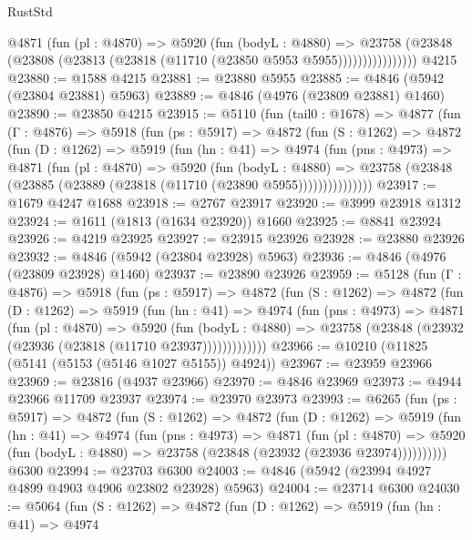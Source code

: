 \begin{lexlean}{RustStd}
\begin{coremodule}
                  @4871
                    (fun (pl : @4870) =>
                    @5920
                      (fun (bodyL : @4880) =>
                      @23758
                        (@23848 (@23808 (@23813 (@23818 (@11710 (@23850 @5953 @5955))))))))))))))))
    @4215
@23880 := @1588 @4215
@23881 := @23880 @5955
@23885 := @4846 (@5942 (@23804 @23881) @5963)
@23889 := @4846 (@4976 (@23809 @23881) @1460)
@23890 := @23850 @4215
@23915 := @5110
    (fun (tail0 : @1678) =>
    @4877
      (fun (Γ : @4876) =>
      @5918
        (fun (ps : @5917) =>
        @4872
          (fun (S : @1262) =>
          @4872
            (fun (D : @1262) =>
            @5919
              (fun (hn : @41) =>
              @4974
                (fun (pns : @4973) =>
                @4871
                  (fun (pl : @4870) =>
                  @5920
                    (fun (bodyL : @4880) =>
                    @23758 (@23848 (@23885 (@23889 (@23818 (@11710 (@23890 @5955)))))))))))))))
@23917 := @1679 @4247 @1688
@23918 := @2767 @23917
@23920 := @3999 @23918 @1312
@23924 := @1611 (@1813 (@1634 @23920)) @1660
@23925 := @8841 @23924
@23926 := @4219 @23925
@23927 := @23915 @23926
@23928 := @23880 @23926
@23932 := @4846 (@5942 (@23804 @23928) @5963)
@23936 := @4846 (@4976 (@23809 @23928) @1460)
@23937 := @23890 @23926
@23959 := @5128
    (fun (Γ : @4876) =>
    @5918
      (fun (ps : @5917) =>
      @4872
        (fun (S : @1262) =>
        @4872
          (fun (D : @1262) =>
          @5919
            (fun (hn : @41) =>
            @4974
              (fun (pns : @4973) =>
              @4871
                (fun (pl : @4870) =>
                @5920
                  (fun (bodyL : @4880) =>
                  @23758 (@23848 (@23932 (@23936 (@23818 (@11710 @23937)))))))))))))
@23966 := @10210 (@11825 (@5141 (@5153 (@5146 @1027 @5155)) @4924))
@23967 := @23959 @23966
@23969 := @23816 (@4937 @23966)
@23970 := @4846 @23969
@23973 := @4944 @23966 @11709 @23937
@23974 := @23970 @23973
@23993 := @6265
    (fun (ps : @5917) =>
    @4872
      (fun (S : @1262) =>
      @4872
        (fun (D : @1262) =>
        @5919
          (fun (hn : @41) =>
          @4974
            (fun (pns : @4973) =>
            @4871
              (fun (pl : @4870) =>
              @5920 (fun (bodyL : @4880) => @23758 (@23848 (@23932 (@23936 @23974))))))))))
    @6300
@23994 := @23703 @6300
@24003 := @4846 (@5942 (@23994 @4927 @4899 @4903 @4906 @23802 @23928) @5963)
@24004 := @23714 @6300
@24030 := @5064
    (fun (S : @1262) =>
    @4872
      (fun (D : @1262) =>
      @5919
        (fun (hn : @41) =>
        @4974

\end{coremodule}
\end{lexlean}
